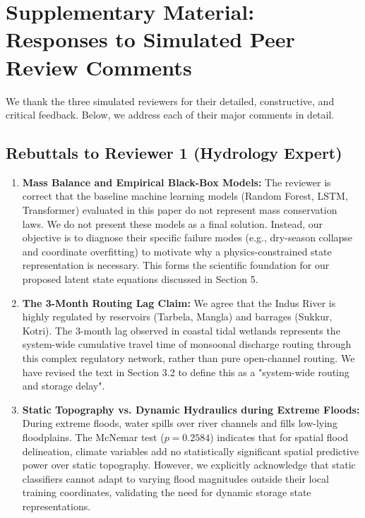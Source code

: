 \section*{Supplementary Material: Responses to Simulated Peer Review Comments}

We thank the three simulated reviewers for their detailed, constructive, and critical feedback. Below, we address each of their major comments in detail.

\subsection*{Rebuttals to Reviewer 1 (Hydrology Expert)}

\begin{enumerate}
    \item \textbf{Mass Balance and Empirical Black-Box Models:} The reviewer is correct that the baseline machine learning models (Random Forest, LSTM, Transformer) evaluated in this paper do not represent mass conservation laws. We do not present these models as a final solution. Instead, our objective is to diagnose their specific failure modes (e.g., dry-season collapse and coordinate overfitting) to motivate why a physics-constrained state representation is necessary. This forms the scientific foundation for our proposed latent state equations discussed in Section 5.
    \item \textbf{The 3-Month Routing Lag Claim:} We agree that the Indus River is highly regulated by reservoirs (Tarbela, Mangla) and barrages (Sukkur, Kotri). The 3-month lag observed in coastal tidal wetlands represents the system-wide cumulative travel time of monsoonal discharge routing through this complex regulatory network, rather than pure open-channel routing. We have revised the text in Section 3.2 to define this as a "system-wide routing and storage delay".
    \item \textbf{Static Topography vs. Dynamic Hydraulics during Extreme Floods:} During extreme floods, water spills over river channels and fills low-lying floodplains. The McNemar test ($p = 0.2584$) indicates that for spatial flood delineation, climate variables add no statistically significant spatial predictive power over static topography. However, we explicitly acknowledge that static classifiers cannot adapt to varying flood magnitudes outside their local training coordinates, validating the need for dynamic storage state representations.
\end{enumerate}

